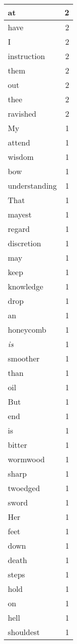 \begin{center}
\begin{longtable}{l|r}
at & 2\\ \hline 
have & 2\\ \hline 
I & 2\\ \hline 
instruction & 2\\ \hline 
them & 2\\ \hline 
out & 2\\ \hline 
thee & 2\\ \hline 
ravished & 2\\ \hline 
My & 1\\ \hline 
attend & 1\\ \hline 
wisdom & 1\\ \hline 
bow & 1\\ \hline 
understanding & 1\\ \hline 
That & 1\\ \hline 
mayest & 1\\ \hline 
regard & 1\\ \hline 
discretion & 1\\ \hline 
may & 1\\ \hline 
keep & 1\\ \hline 
knowledge & 1\\ \hline 
drop & 1\\ \hline 
an & 1\\ \hline 
honeycomb & 1\\ \hline 
\emph{is} & 1\\ \hline 
smoother & 1\\ \hline 
than & 1\\ \hline 
oil & 1\\ \hline 
But & 1\\ \hline 
end & 1\\ \hline 
is & 1\\ \hline 
bitter & 1\\ \hline 
wormwood & 1\\ \hline 
sharp & 1\\ \hline 
twoedged & 1\\ \hline 
sword & 1\\ \hline 
Her & 1\\ \hline 
feet & 1\\ \hline 
down & 1\\ \hline 
death & 1\\ \hline 
steps & 1\\ \hline 
hold & 1\\ \hline 
on & 1\\ \hline 
hell & 1\\ \hline 
shouldest & 1\\ \hline 

\end{longtable}
\end{center}
